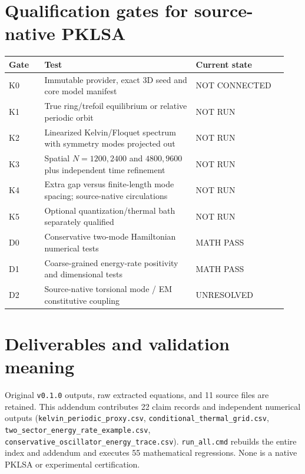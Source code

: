 \documentclass[10pt,a4paper]{article}
\begin{document}
\section{Qualification gates for source-native PKLSA}
\begin{tabular}{@{}p{0.12\linewidth}p{0.51\linewidth}p{0.31\linewidth}@{}}\toprule
Gate & Test & Current state\\\midrule
K0 & Immutable provider, exact 3D seed and core model manifest & NOT CONNECTED\\
K1 & True ring/trefoil equilibrium or relative periodic orbit & NOT RUN\\
K2 & Linearized Kelvin/Floquet spectrum with symmetry modes projected out & NOT RUN\\
K3 & Spatial $N=1200,2400$ and $4800,9600$ plus independent time refinement & NOT RUN\\
K4 & Extra gap versus finite-length mode spacing; source-native circulations & NOT RUN\\
K5 & Optional quantization/thermal bath separately qualified & NOT RUN\\
D0 & Conservative two-mode Hamiltonian numerical tests & MATH PASS\\
D1 & Coarse-grained energy-rate positivity and dimensional tests & MATH PASS\\
D2 & Source-native torsional mode / EM constitutive coupling & UNRESOLVED\\\bottomrule
\end{tabular}

\section{Deliverables and validation meaning}
Original \texttt{v0.1.0} outputs, raw extracted equations, and 11 source files are retained. This addendum contributes 22 claim records and independent numerical outputs (\texttt{kelvin\_periodic\_proxy.csv}\allowbreak, \texttt{conditional\_thermal\_grid.csv}\allowbreak, \texttt{two\_sector\_energy\_rate\_example.csv}\allowbreak, \texttt{conservative\_oscillator\_energy\_trace.csv}). \texttt{run\_all.cmd} rebuilds the entire index and addendum and executes 55 mathematical regressions. None is a native PKLSA or experimental certification.
\end{document}
